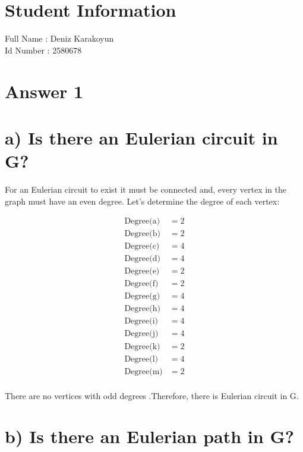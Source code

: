 \documentclass[12pt]{article}
\begin{document}
\section*{Student Information } 
Full Name :  Deniz Karakoyun\\
Id Number :  2580678\\

\section*{Answer 1}



\section*{a) Is there an Eulerian circuit in G?}

For an Eulerian circuit to exist it must be connected and, every vertex in the graph must have an even degree. Let's determine the degree of each vertex:

\begin{align*}
\text{Degree(a)} &= 2 \\
\text{Degree(b)} &= 2 \\
\text{Degree(c)} &= 4 \\
\text{Degree(d)} &= 4 \\
\text{Degree(e)} &= 2 \\
\text{Degree(f)} &= 2 \\
\text{Degree(g)} &= 4 \\
\text{Degree(h)} &= 4 \\
\text{Degree(i)} &= 4 \\
\text{Degree(j)} &= 4 \\
\text{Degree(k)} &= 2 \\
\text{Degree(l)} &= 4 \\
\text{Degree(m)} &= 2 \\
\end{align*}

There are no vertices with odd degrees .Therefore, there is  Eulerian circuit in G.

\section*{b) Is there an Eulerian path in G?}
\end{document}
